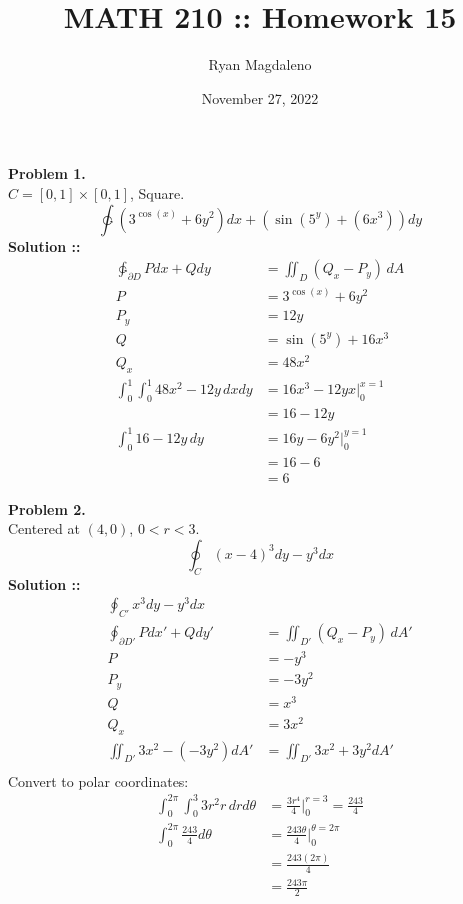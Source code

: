\documentclass[11pt]{article}
\date{November 27, 2022}
\title{MATH 210 :\hspace{2px}: Homework 15}
\author{Ryan Magdaleno}
\begin{document}
\maketitle


\textbf{Problem 1.} \\
$C = [0, 1]\times[0,1]$, Square.
$$\ointctrclockwise \left(3^{\cos(x)}+6y^2\right)dx + 
\left(\sin (5^y) + (6x^3)\right)dy$$
\vspace{5px}\textbf{Solution ::}
\begin{align}
    \ointctrclockwise_{\partial D}Pdx+Qdy &= \iint_D (Q_x-P_y)\,dA \\
    P &= 3^{\cos(x)}+6y^2 \\
    P_y &= 12y \\
    Q &= \sin (5^y) + 16x^3 \\
    Q_x &= 48x^2 \\
    \int_{0}^{1}\int_{0}^{1} 48x^2-12y\, dxdy &= 16x^3-12yx\bigg|^{x=1}_0 \\
    &= 16-12y \\
    \int_{0}^{1} 16-12y\, dy &= 16y-6y^2\bigg|^{y=1}_0 \\
    &=16-6 \\
    &= 6
\end{align}
\pagebreak


\textbf{Problem 2.} \\
Centered at $(4,0)$, $0<r<3$.
$$\oint_C (x-4)^3dy-y^3dx$$
\vspace{5px}\textbf{Solution ::}
\begin{align}
    \oint_{C'}x^3dy-y^3dx& \\
    \oint_{\partial D'}Pdx' + Qdy'&= \iint_{D'}(Q_x-P_y)\,dA' \\
    P &= -y^3 \\
    P_y &= -3y^2 \\
    Q &= x^3 \\
    Q_x &= 3x^2 \\
    \iint_{D'}3x^2 - (-3y^2)dA' &= \iint_{D'}3x^2+3y^2 dA' \\
\end{align}
Convert to polar coordinates:
\begin{align}
    \int_{0}^{2\pi}\int_{0}^{3}3r^2r\,drd\theta &= \frac{3r^4}{4}\bigg|^{r=3}_0 =
    \frac{243}{4} \\
    \int_{0}^{2\pi}\frac{243}{4}d\theta &= \frac{243\theta}{4}\bigg|^{\theta=2\pi}_0 \\
    &=\frac{243(2\pi)}{4} \\
    &= \frac{243\pi}{2}
\end{align}
\pagebreak
\end{document}

